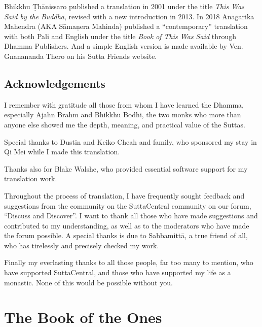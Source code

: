 \documentclass[12pt,openany]{book}%
\let\oldcontentsline\contentsline
\newcommand{\nopagecontentsline}[3]{\oldcontentsline{#1}{#2}{}}
\let\oldmainmatter\mainmatter
\renewcommand{\mainmatter}{%
\chapterfont{\setstretch{.85}\normalfont\centering}%
\sectionfont{\setstretch{.85}\normalfont\centering}%
\oldmainmatter}
\begin{document}
Bhikkhu \textsanskrit{Ṭhānissaro} published a translation in 2001 under the title \textit{This Was Said by the Buddha}, revised with a new introduction in 2013. In 2018 Anagarika Mahendra (AKA \textsanskrit{Sāmaṇera} Mahinda) published a “contemporary” translation with both Pali and English under the title \textit{Book of This Was Said} through Dhamma Publishers. And a simple English version is made available by Ven. Gnanananda Thero on his Sutta Friends website.

%
\chapter*{Acknowledgements}

I remember with gratitude all those from whom I have learned the Dhamma, especially Ajahn Brahm and Bhikkhu Bodhi, the two monks who more than anyone else showed me the depth, meaning, and practical value of the Suttas.

Special thanks to Dustin and Keiko Cheah and family, who sponsored my stay in Qi Mei while I made this translation.

Thanks also for Blake Walshe, who provided essential software support for my translation work.

Throughout the process of translation, I have frequently sought feedback and suggestions from the community on the SuttaCentral community on our forum, “Discuss and Discover”. I want to thank all those who have made suggestions and contributed to my understanding, as well as to the moderators who have made the forum possible. A special thanks is due to \textsanskrit{Sabbamittā}, a true friend of all, who has tirelessly and precisely checked my work.

Finally my everlasting thanks to all those people, far too many to mention, who have supported SuttaCentral, and those who have supported my life as a monastic. None of this would be possible without you.

%
\mainmatter%
\pagestyle{fancy}%
\part*{The Book of the Ones}
\markboth{}{}
\addtocontents{toc}{\let\protect\contentsline\protect\oldcontentsline}
\end{document}
